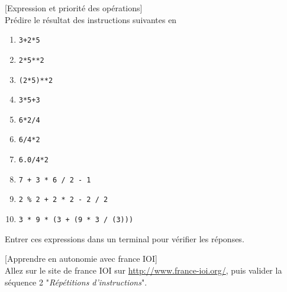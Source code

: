 \documentclass[a4paper,12pt]{article}
\newcommand{\numero}{6}                                    %
\begin{document}
\exo{}[Expression et priorité des opérations]  ~\\ 
Prédire le résultat des instructions suivantes en \py
\begin{multicols}{2}
	\begin{enumerate}[label=\alph*)]
		\item \lstinline{3+2*5}
		\item \lstinline{2*5**2}
		\item \lstinline{(2*5)**2}
		\item \lstinline{3*5+3}
		\item \lstinline{6*2/4}
		\item \lstinline{6/4*2}
		\item \lstinline{6.0/4*2}
		\item \lstinline{7 + 3 * 6 / 2 - 1}
		\item \lstinline{2 % 2 + 2 * 2 - 2 / 2}
			\item \lstinline{3 * 9 * (3 + (9 * 3 / (3)))}
		\end{enumerate}
	\end{multicols}
	Entrer ces expressions dans un terminal \py pour vérifier les réponses.
\finexo

\exo{}[Apprendre en  autonomie avec france IOI]  ~\\ 
Allez sur le site de france IOI sur \url{http://www.france-ioi.org/}, puis valider la séquence 2 "\textit{Répétitions d'instructions}".
\finexo


		\newpage
		\setcounter{page}{1}
		\setcounter{section}{\numero}
		

		\section{}
	
\end{document}

